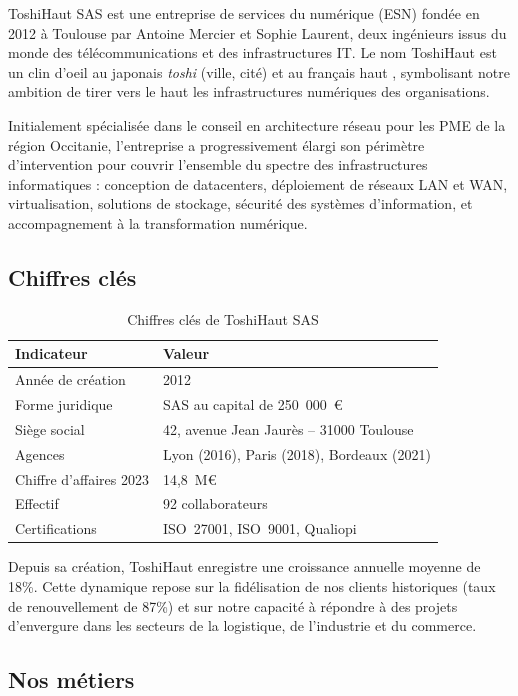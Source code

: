 \documentclass[12pt,a4paper]{report}
\begin{document}
ToshiHaut SAS est une entreprise de services du numérique (ESN) fondée en 2012 à Toulouse par Antoine Mercier et Sophie Laurent, deux ingénieurs issus du monde des télécommunications et des infrastructures IT. Le nom \og ToshiHaut \fg{} est un clin d'oeil au japonais \textit{toshi} (ville, cité) et au français \og haut \fg{}, symbolisant notre ambition de tirer vers le haut les infrastructures numériques des organisations.

Initialement spécialisée dans le conseil en architecture réseau pour les PME de la région Occitanie, l'entreprise a progressivement élargi son périmètre d'intervention pour couvrir l'ensemble du spectre des infrastructures informatiques : conception de datacenters, déploiement de réseaux LAN et WAN, virtualisation, solutions de stockage, sécurité des systèmes d'information, et accompagnement à la transformation numérique.

\subsection{Chiffres clés}

\begin{table}[H]
\centering
\begin{tabular}{ll}
\toprule
\textbf{Indicateur} & \textbf{Valeur} \\
\midrule
Année de création & 2012 \\
Forme juridique & SAS au capital de 250~000~\euro{} \\
Siège social & 42, avenue Jean Jaurès -- 31000 Toulouse \\
Agences & Lyon (2016), Paris (2018), Bordeaux (2021) \\
Chiffre d'affaires 2023 & 14,8~M\euro{} \\
Effectif & 92 collaborateurs \\
Certifications & ISO~27001, ISO~9001, Qualiopi \\
\bottomrule
\end{tabular}
\caption{Chiffres clés de ToshiHaut SAS}
\end{table}

Depuis sa création, ToshiHaut enregistre une croissance annuelle moyenne de 18\%. Cette dynamique repose sur la fidélisation de nos clients historiques (taux de renouvellement de 87\%) et sur notre capacité à répondre à des projets d'envergure dans les secteurs de la logistique, de l'industrie et du commerce.

\subsection{Nos métiers}
\end{document}
